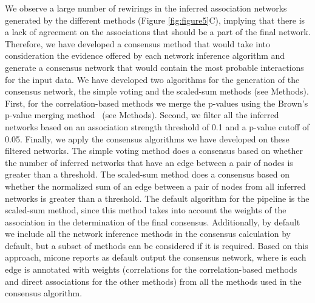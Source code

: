   We observe a large number of rewirings in the inferred association networks generated by the different methods (Figure \ref{fig:figure5}C), implying that there is a lack of agreement on the associations that should be a part of the final network.
  Therefore, we have developed a consensus method that would take into consideration the evidence offered by each network inference algorithm and generate a consensus network that would contain the most probable interactions for the input data.
  We have developed two algorithms for the generation of the consensus network, the simple voting and the scaled-sum methods (see Methods).
  First, for the correlation-based methods we merge the p-values using the Brown's p-value merging method~\cite{Poole_Gibbs_Shmulevich_Bernard_Knijnenburg_2016,faustCoNetAppInference2016} (see Methods).
  Second, we filter all the inferred networks based on an association strength threshold of 0.1 and a p-value cutoff of 0.05.
  Finally, we apply the consensus algorithms we have developed on these filtered networks.
  The simple voting method does a consensus based on whether the number of inferred networks that have an edge between a pair of nodes is greater than a threshold.
  The scaled-sum method does a consensus based on whether the normalized sum of an edge between a pair of nodes from all inferred networks is greater than a threshold.
  The default algorithm for the pipeline is the scaled-sum method, since this method takes into account the weights of the association in the determination of the final consensus.
  Additionally, by default we include all the network inference methods in the consensus calculation by default, but a subset of methods can be considered if it is required.
  Based on this approach, \ac{micone} reports as default output the consensus network, where is each edge is annotated with weights (correlations for the correlation-based methods and direct associations for the other methods) from all the methods used in the consensus algorithm.

